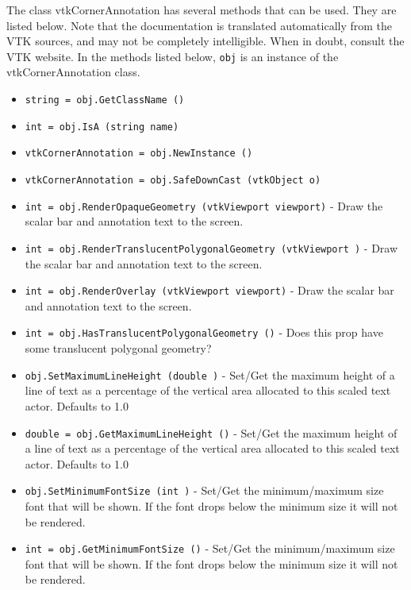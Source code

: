 The class vtkCornerAnnotation has several methods that can be used.
  They are listed below.
Note that the documentation is translated automatically from the VTK sources,
and may not be completely intelligible.  When in doubt, consult the VTK website.
In the methods listed below, \verb|obj| is an instance of the vtkCornerAnnotation class.
\begin{itemize}
\item  \verb|string = obj.GetClassName ()|

\item  \verb|int = obj.IsA (string name)|

\item  \verb|vtkCornerAnnotation = obj.NewInstance ()|

\item  \verb|vtkCornerAnnotation = obj.SafeDownCast (vtkObject o)|

\item  \verb|int = obj.RenderOpaqueGeometry (vtkViewport viewport)| -  Draw the scalar bar and annotation text to the screen.

\item  \verb|int = obj.RenderTranslucentPolygonalGeometry (vtkViewport )| -  Draw the scalar bar and annotation text to the screen.

\item  \verb|int = obj.RenderOverlay (vtkViewport viewport)| -  Draw the scalar bar and annotation text to the screen.

\item  \verb|int = obj.HasTranslucentPolygonalGeometry ()| -  Does this prop have some translucent polygonal geometry?

\item  \verb|obj.SetMaximumLineHeight (double )| -  Set/Get the maximum height of a line of text as a 
 percentage of the vertical area allocated to this
 scaled text actor. Defaults to 1.0

\item  \verb|double = obj.GetMaximumLineHeight ()| -  Set/Get the maximum height of a line of text as a 
 percentage of the vertical area allocated to this
 scaled text actor. Defaults to 1.0

\item  \verb|obj.SetMinimumFontSize (int )| -  Set/Get the minimum/maximum size font that will be shown.
 If the font drops below the minimum size it will not be rendered.

\item  \verb|int = obj.GetMinimumFontSize ()| -  Set/Get the minimum/maximum size font that will be shown.
 If the font drops below the minimum size it will not be rendered.


\end{itemize}
